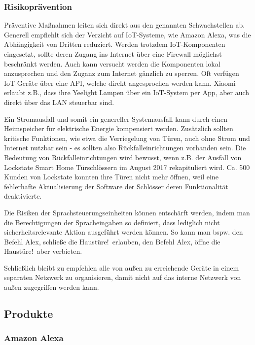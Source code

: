 \subsubsection{Risikoprävention}

Präventive Maßnahmen leiten sich direkt aus den genannten Schwachstellen ab.
Generell empfiehlt sich der Verzicht auf \ac{IoT}-Systeme, wie Amazon Alexa, was die Abhängigkeit von Dritten reduziert.
Werden trotzdem \ac{IoT}-Komponenten eingesetzt, sollte deren Zugang ins Internet über eine Firewall möglichst beschränkt werden.
Auch kann versucht werden die Komponenten lokal anzusprechen und den Zuganz zum Internet gänzlich zu sperren.
Oft verfügen \ac{IoT}-Geräte über eine \ac{API}, welche direkt angesprochen werden kann.
Xiaomi erlaubt z.B., dass ihre Yeelight Lampen über ein \ac{IoT}-System per App, aber auch direkt über das \ac{LAN} steuerbar sind.

Ein Stromausfall und somit ein genereller Systemausfall kann durch einen Heimspeicher für elektrische Energie kompensiert werden.
Zusätzlich sollten kritische Funktionen, wie etwa die Verriegelung von Türen, auch ohne Strom und Internet nutzbar sein - es sollten also Rückfalleinrichtungen vorhanden sein.
Die Bedeutung von Rückfalleinrichtungen wird bewusst, wenn z.B. der Ausfall von Lockstate Smart Home Türschlössern im August 2017 rekapituliert wird.
Ca. 500 Kunden von Lockstate konnten ihre Türen nicht mehr öffnen, weil eine fehlerhafte Aktualisierung der Software der Schlösser deren Funktionalität deaktivierte.

Die Risiken der Sprachsteuerungseinheiten können entschärft werden, indem man die Berechtigungen der Spracheingaben so definiert, dass lediglich nicht sicherheitsrelevante Aktion ausgeführt werden können.
So kann man bspw. den Befehl \glqq Alex, schließe die Haustüre!\grqq \ erlauben, den Befehl \glqq Alex, öffne die Haustüre!\grqq \ aber verbieten.

Schließlich bleibt zu empfehlen alle von außen zu erreichende Geräte in einem separaten Netzwerk zu organisieren, damit nicht auf das interne Netzwerk von außen zugegriffen werden kann.

\subsection{Produkte}


\subsubsection{Amazon Alexa}

